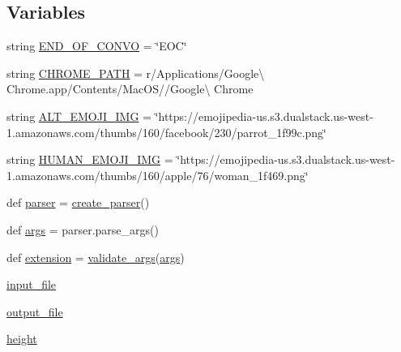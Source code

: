 \subsection*{Variables}
\begin{DoxyCompactItemize}
\item 
string \hyperlink{namespaceparlai_1_1scripts_1_1convo__render_a0b17fd0545682b7ffaca7d0ffd467097}{E\+N\+D\+\_\+\+O\+F\+\_\+\+C\+O\+N\+VO} = \char`\"{}E\+OC\char`\"{}
\item 
string \hyperlink{namespaceparlai_1_1scripts_1_1convo__render_ab47b0a7a9443c72696d260ad5e6ac747}{C\+H\+R\+O\+M\+E\+\_\+\+P\+A\+TH} = r\textquotesingle{}/Applications/Google\textbackslash{} Chrome.\+app/Contents/Mac\+OS//Google\textbackslash{} Chrome\textquotesingle{}
\item 
string \hyperlink{namespaceparlai_1_1scripts_1_1convo__render_a857bb24c69ad3368ee6d8d1f3f389420}{A\+L\+T\+\_\+\+E\+M\+O\+J\+I\+\_\+\+I\+MG} = \char`\"{}https\+://emojipedia-\/us.\+s3.\+dualstack.\+us-\/west-\/1.amazonaws.\+com/thumbs/160/facebook/230/parrot\+\_\+1f99c.\+png\char`\"{}
\item 
string \hyperlink{namespaceparlai_1_1scripts_1_1convo__render_a8c9924b497f4ab5ba5f2c7afdd3f1007}{H\+U\+M\+A\+N\+\_\+\+E\+M\+O\+J\+I\+\_\+\+I\+MG} = \char`\"{}https\+://emojipedia-\/us.\+s3.\+dualstack.\+us-\/west-\/1.amazonaws.\+com/thumbs/160/apple/76/woman\+\_\+1f469.\+png\char`\"{}
\item 
def \hyperlink{namespaceparlai_1_1scripts_1_1convo__render_a66082a46c40bcc30c10d6d0dc2601148}{parser} = \hyperlink{namespaceparlai_1_1scripts_1_1convo__render_a4220e40f3e0c5ac320177b6e0f3d8e83}{create\+\_\+parser}()
\item 
def \hyperlink{namespaceparlai_1_1scripts_1_1convo__render_a9db4d889d4ee08e848b2c0526120483b}{args} = parser.\+parse\+\_\+args()
\item 
def \hyperlink{namespaceparlai_1_1scripts_1_1convo__render_a200ef459a5881d33edb501b16997ac2f}{extension} = \hyperlink{namespaceparlai_1_1scripts_1_1convo__render_a4078a037f4f5526297e7860fbed9cfb2}{validate\+\_\+args}(\hyperlink{namespaceparlai_1_1scripts_1_1convo__render_a9db4d889d4ee08e848b2c0526120483b}{args})
\item 
\hyperlink{namespaceparlai_1_1scripts_1_1convo__render_a708724a5430d3e0236e76dc23ed66801}{input\+\_\+file}
\item 
\hyperlink{namespaceparlai_1_1scripts_1_1convo__render_ad3c1d6fa9a8463d68b415f7a995db518}{output\+\_\+file}
\item 
\hyperlink{namespaceparlai_1_1scripts_1_1convo__render_a3ea95c859b230a646a5c6fe5b4586b67}{height}

\end{DoxyCompactItemize}

